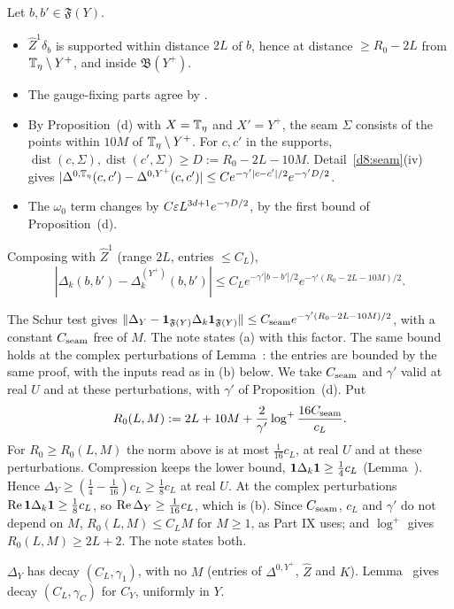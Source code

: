 \begin{detail}\label{d8:lf-a}
\begin{step}
Let $b,b'\in\mathfrak F(Y)$.
\begin{itemize}
\item $\hat Z^1\delta_b$ is supported within distance $2L$ of $b$, hence at distance $\ge R_0-2L$ from $\mathbb T_\eta\setminus Y^+$, and inside $\mathfrak B(Y^+)$.
\item The gauge-fixing parts agree by .
\item By Proposition~(d) with $X=\mathbb T_\eta$ and $X'=Y^+$, the seam $\Sigma$ consists of the points within $10M$ of $\mathbb T_\eta\setminus Y^+$. For $c,c'$ in the supports, $\operatorname{dist}(c,\Sigma),\operatorname{dist}(c',\Sigma)\ge D:=R_0-2L-10M$. Detail~\ref{d8:seam}(iv) gives $|\Delta^{0,\mathbb T_\eta}(c,c')-\Delta^{0,Y^+}(c,c')|\le Ce^{-\gamma'|c-c'|/2}e^{-\gamma'D/2}$.
\item The $\omega_0$ term changes by $C\varepsilon L^{3d+1}e^{-\gamma D/2}$, by the first bound of Proposition~(d).
\end{itemize}
Composing with $\hat Z^1$ (range $2L$, entries $\le C_L$),
\[
|\Delta_k(b,b')-\Delta^{(Y^+)}_k(b,b')|\le C_Le^{-\gamma'|b-b'|/2}e^{-\gamma'(R_0-2L-10M)/2}.
\]
\end{step}
\begin{step}
The Schur test gives $\|\Delta_Y-\mathbf 1_{\mathfrak F(Y)}\Delta_k\mathbf 1_{\mathfrak F(Y)}\|\le C_{\rm seam}e^{-\gamma'(R_0-2L-10M)/2}$, with a constant $C_{\rm seam}$ free of $M$. The note states (a) with this factor. The same bound holds at the complex perturbations of Lemma~: the entries are bounded by the same proof, with the inputs read as in (b) below. We take $C_{\rm seam}$ and $\gamma'$ valid at real $U$ and at these perturbations, with $\gamma'$ of Proposition~(d). Put
\[
R_0(L,M):=2L+10M+\frac2{\gamma'}\log^+\frac{16C_{\rm seam}}{c_L}.
\]
For $R_0\ge R_0(L,M)$ the norm above is at most $\frac1{16}c_L$, at real $U$ and at these perturbations. Compression keeps the lower bound, $\mathbf 1\Delta_k\mathbf 1\ge\frac14c_L$ (Lemma~). Hence $\Delta_Y\ge(\frac14-\frac1{16})c_L\ge\frac18c_L$ at real $U$. At the complex perturbations $\operatorname{Re}\mathbf 1\Delta_k\mathbf 1\ge\frac18c_L$, so $\operatorname{Re}\Delta_Y\ge\frac1{16}c_L$, which is (b). Since $C_{\rm seam}$, $c_L$ and $\gamma'$ do not depend on $M$, $R_0(L,M)\le C_LM$ for $M\ge1$, as Part IX uses; and $\log^+$ gives $R_0(L,M)\ge2L+2$. The note states both.
\end{step}
\begin{step}
$\Delta_Y$ has decay $(C_L,\gamma_1)$, with no $M$ (entries of $\Delta^{0,Y^+}$, $\hat Z$ and $K$). Lemma~ gives decay $(C_L,\gamma_C)$ for $C_Y$, uniformly in $Y$.
\end{step}
\end{detail}

